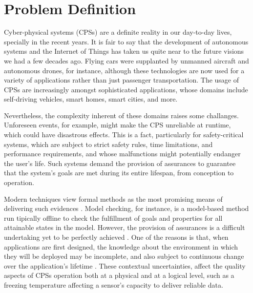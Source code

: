 \section{Problem Definition}

Cyber-physical systems (CPSs) are a definite reality in our day-to-day lives, specially in the recent years. It is fair to say that the development of autonomous systems and the Internet of Things has taken us quite near to the future visions we had a few decades ago. Flying cars were supplanted by unmanned aircraft and autonomous drones, for instance, although these technologies are now used for a variety of applications rather than just passenger transportation. The usage of CPSs are increasingly amongst sophisticated applications, whose domains include self-driving vehicles, smart homes, smart cities, and more.

Nevertheless, the complexity inherent of these domains raises some challanges. Unforeseen events, for example, might make the CPS unreliable at runtime, which could have disastrous effects. This is a fact, particularly for safety-critical systems, which are subject to strict safety rules, time limitations, and performance requirements, and whose malfunctions might potentially endanger the user's life. Such systems demand the provision of assurances to guarantee that the system's goals are met during its entire lifespan, from conception to operation. 

Modern techniques view formal methods as the most promising means of delivering such evidences \cite{assurances2017}. Model checking, for instance, is a model-based method run tipically offline to check the fulfillment of goals and properties for all attainable states in the model. 
However, the provision of assurances is a difficult undertaking yet to be perfectly achieved \cite{patankar2020safety}. One of the reasons is that, when applications are first designed, the knowledge about the environment in which they will be deployed may be incomplete, and also subject to continuous change over the application's lifetime \cite{assurances2017}. These contextual uncertainties, affect the quality aspects of CPSs operation both at a physical and at a logical level, such as a freezing temperature affecting a sensor's capacity to deliver reliable data. 

